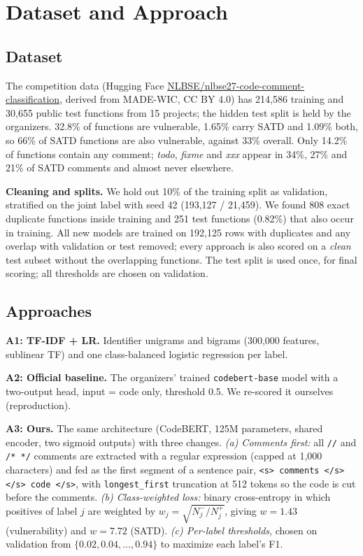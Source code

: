 \documentclass[conference]{IEEEtran}
\begin{document}
\section{Dataset and Approach}
\subsection{Dataset}
The competition data (Hugging Face \url{NLBSE/nlbse27-code-comment-classification}, derived from MADE-WIC, CC BY 4.0) has 214,586 training and 30,655 public test functions from 15 projects; the hidden test split is held by the organizers. 32.8\% of functions are vulnerable, 1.65\% carry SATD and 1.09\% both, so 66\% of SATD functions are also vulnerable, against 33\% overall. Only 14.2\% of functions contain any comment; \emph{todo}, \emph{fixme} and \emph{xxx} appear in 34\%, 27\% and 21\% of SATD comments and almost never elsewhere.

\textbf{Cleaning and splits.} We hold out 10\% of the training split as validation, stratified on the joint label with seed 42 (193,127 / 21,459). We found 808 exact duplicate functions inside training and 251 test functions (0.82\%) that also occur in training. All new models are trained on 192,125 rows with duplicates and any overlap with validation or test removed; every approach is also scored on a \emph{clean} test subset without the overlapping functions. The test split is used once, for final scoring; all thresholds are chosen on validation.

\subsection{Approaches}
\textbf{A1: TF-IDF + LR.} Identifier unigrams and bigrams (300,000 features, sublinear TF) and one class-balanced logistic regression per label.

\textbf{A2: Official baseline.} The organizers' trained \texttt{codebert-base} model with a two-output head, input = code only, threshold 0.5. We re-scored it ourselves (reproduction).

\textbf{A3: Ours.} The same architecture (CodeBERT, 125M parameters, shared encoder, two sigmoid outputs) with three changes. \emph{(a) Comments first:} all \texttt{//} and \texttt{/* */} comments are extracted with a regular expression (capped at 1,000 characters) and fed as the first segment of a sentence pair, \texttt{<s> comments </s></s> code </s>}, with \texttt{longest\_first} truncation at 512 tokens so the code is cut before the comments. \emph{(b) Class-weighted loss:} binary cross-entropy in which positives of label $j$ are weighted by $w_j=\sqrt{N_j^-/N_j^+}$, giving $w=1.43$ (vulnerability) and $w=7.72$ (SATD). \emph{(c) Per-label thresholds}, chosen on validation from $\{0.02,0.04,\dots,0.94\}$ to maximize each label's F1.
\end{document}
